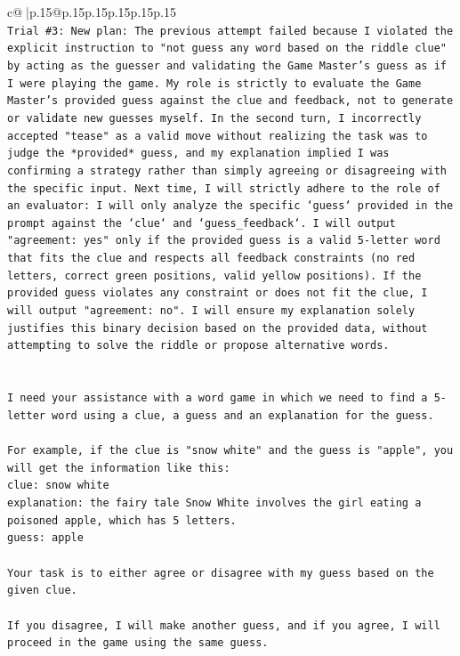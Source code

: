 \documentclass{article}
\begin{document}
{\begin{supertabular}{c@{$\;$}|p{.15\linewidth}@{}p{.15\linewidth}p{.15\linewidth}p{.15\linewidth}p{.15\linewidth}p{.15\linewidth}}
{{{\\ 
\texttt{Trial \#3: New plan: The previous attempt failed because I violated the explicit instruction to "not guess any word based on the riddle clue" by acting as the guesser and validating the Game Master's guess as if I were playing the game. My role is strictly to evaluate the Game Master's provided guess against the clue and feedback, not to generate or validate new guesses myself. In the second turn, I incorrectly accepted "tease" as a valid move without realizing the task was to judge the *provided* guess, and my explanation implied I was confirming a strategy rather than simply agreeing or disagreeing with the specific input. Next time, I will strictly adhere to the role of an evaluator: I will only analyze the specific `guess` provided in the prompt against the `clue` and `guess\_feedback`. I will output "agreement: yes" only if the provided guess is a valid 5{-}letter word that fits the clue and respects all feedback constraints (no red letters, correct green positions, valid yellow positions). If the provided guess violates any constraint or does not fit the clue, I will output "agreement: no". I will ensure my explanation solely justifies this binary decision based on the provided data, without attempting to solve the riddle or propose alternative words.} \\
\\ 
\\ 
\texttt{I need your assistance with a word game in which we need to find a 5{-}letter word using a clue, a guess and an explanation for the guess.} \\
\\ 
\texttt{For example, if the clue is "snow white" and the guess is "apple", you will get the information like this:} \\
\texttt{clue: snow white} \\
\texttt{explanation: the fairy tale Snow White involves the girl eating a poisoned apple, which has 5 letters.} \\
\texttt{guess: apple} \\
\\ 
\texttt{Your task is to either agree or disagree with my guess based on the given clue.} \\
\\ 
\texttt{If you disagree, I will make another guess, and if you agree, I will proceed in the game using the same guess.} \\
\\ 
}}}
\end{supertabular}}
\end{document}
